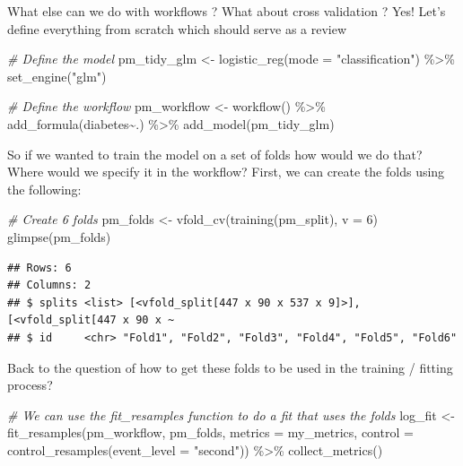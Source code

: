 \documentclass[
]{article}
\newenvironment{Shaded}{\begin{snugshade}}{\end{snugshade}}
\newcommand{\AttributeTok}[1]{\textcolor[rgb]{0.77,0.63,0.00}{#1}}
\newcommand{\CommentTok}[1]{\textcolor[rgb]{0.56,0.35,0.01}{\textit{#1}}}
\newcommand{\DecValTok}[1]{\textcolor[rgb]{0.00,0.00,0.81}{#1}}
\newcommand{\FunctionTok}[1]{\textcolor[rgb]{0.00,0.00,0.00}{#1}}
\newcommand{\NormalTok}[1]{#1}
\newcommand{\OtherTok}[1]{\textcolor[rgb]{0.56,0.35,0.01}{#1}}
\newcommand{\SpecialCharTok}[1]{\textcolor[rgb]{0.00,0.00,0.00}{#1}}
\newcommand{\StringTok}[1]{\textcolor[rgb]{0.31,0.60,0.02}{#1}}
\begin{document}
What else can we do with workflows ? What about cross validation ? Yes!
Let's define everything from scratch which should serve as a review

\begin{Shaded}
\begin{Highlighting}[]
\CommentTok{\# Define the model}
\NormalTok{pm\_tidy\_glm }\OtherTok{\textless{}{-}} \FunctionTok{logistic\_reg}\NormalTok{(}\AttributeTok{mode =} \StringTok{"classification"}\NormalTok{) }\SpecialCharTok{\%\textgreater{}\%}
  \FunctionTok{set\_engine}\NormalTok{(}\StringTok{"glm"}\NormalTok{) }

\CommentTok{\# Define the workflow}
\NormalTok{pm\_workflow }\OtherTok{\textless{}{-}} \FunctionTok{workflow}\NormalTok{() }\SpecialCharTok{\%\textgreater{}\%}
  \FunctionTok{add\_formula}\NormalTok{(diabetes}\SpecialCharTok{\textasciitilde{}}\NormalTok{.) }\SpecialCharTok{\%\textgreater{}\%} 
  \FunctionTok{add\_model}\NormalTok{(pm\_tidy\_glm)}
\end{Highlighting}
\end{Shaded}

So if we wanted to train the model on a set of folds how would we do
that? Where would we specify it in the workflow? First, we can create
the folds using the following:

\begin{Shaded}
\begin{Highlighting}[]
\CommentTok{\# Create 6 folds}
\NormalTok{pm\_folds }\OtherTok{\textless{}{-}} \FunctionTok{vfold\_cv}\NormalTok{(}\FunctionTok{training}\NormalTok{(pm\_split), }\AttributeTok{v =} \DecValTok{6}\NormalTok{)}
\FunctionTok{glimpse}\NormalTok{(pm\_folds)}
\end{Highlighting}
\end{Shaded}

\begin{verbatim}
## Rows: 6
## Columns: 2
## $ splits <list> [<vfold_split[447 x 90 x 537 x 9]>], [<vfold_split[447 x 90 x ~
## $ id     <chr> "Fold1", "Fold2", "Fold3", "Fold4", "Fold5", "Fold6"
\end{verbatim}

Back to the question of how to get these folds to be used in the
training / fitting process?

\begin{Shaded}
\begin{Highlighting}[]
\CommentTok{\# We can use the fit\_resamples function to do a fit that uses the folds}
\NormalTok{log\_fit }\OtherTok{\textless{}{-}} \FunctionTok{fit\_resamples}\NormalTok{(pm\_workflow, }
\NormalTok{                         pm\_folds, }
                         \AttributeTok{metrics =}\NormalTok{ my\_metrics,}
                         \AttributeTok{control =} \FunctionTok{control\_resamples}\NormalTok{(}\AttributeTok{event\_level =} \StringTok{"second"}\NormalTok{)) }\SpecialCharTok{\%\textgreater{}\%}
  \FunctionTok{collect\_metrics}\NormalTok{()}
\end{Highlighting}
\end{Shaded}
\end{document}

